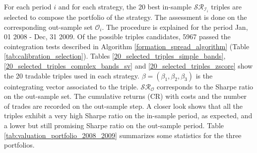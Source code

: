 \documentclass[11pt,a4,twosided,singlespacing,titlepagenumber=on]{scrreprt}
\numberwithin{equation}{chapter} %
\theoremstyle{remark}
\begin{document}
For each period $i$ and for each strategy, the 20 best in-sample $\mathcal{SR}_{\mathcal{I}_i}$ triples are selected to compose the portfolio of the strategy. The assessment is done on the corresponding out-sample set $\mathcal{O}_i$. The procedure is explained for the period Jan, 01 2008 - Dec, 31 2009. Of the possible triples candidates, 5967 passed the cointegration tests described in Algorithm \ref{formation_spread_algorithm} (Table \ref{tab:calibration_selection}). Tables \ref{20_selected_triples_simple_bands}, \ref{20_selected_triples_complex_bands_sv} and \ref{20_selected_triples_zscore} show the 20 tradable triples used in each strategy. $\beta = (\beta_1, \beta_2, \beta_3)$ is the cointegrating vector associated to the triple. $\mathcal{SR}_\mathcal{O}$ corresponds to the Sharpe ratio on the out-sample set. The cumulative returns (CR) with costs and the number of trades are recorded on the out-sample step. A closer look shows that all the triples exhibit a very high Sharpe ratio on the in-sample period, as expected, and a lower but still promising Sharpe ratio on the out-sample period. Table \ref{tab:valuation_portfolio_2008_2009} summarizes some statistics for the three portfolios.
\end{document}
